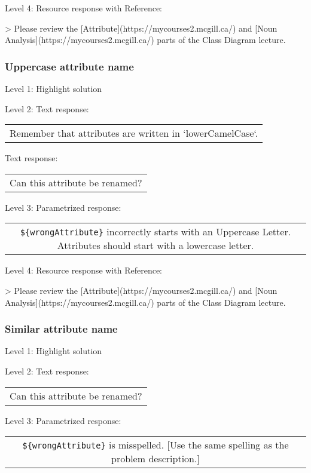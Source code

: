 \noindent Level 4: Resource response with Reference:

> Please review the [Attribute](https://mycourses2.mcgill.ca/) and [Noun Analysis](https://mycourses2.mcgill.ca/) parts of the Class Diagram lecture.


\subsubsection{Uppercase attribute name}

\noindent Level 1: Highlight solution \medskip

\noindent Level 2: Text response: \medskip

\begin{tabular}{|c}
Remember that attributes are written in `lowerCamelCase`.
\end{tabular} \medskip

Text response: \medskip

\begin{tabular}{|c}
Can this attribute be renamed?
\end{tabular} \medskip

\noindent Level 3: Parametrized response: \medskip

\begin{tabular}{|c}
\verb|${wrongAttribute}| incorrectly starts with an Uppercase Letter. Attributes should start with a lowercase letter.
\end{tabular} \medskip

\noindent Level 4: Resource response with Reference:

> Please review the [Attribute](https://mycourses2.mcgill.ca/) and [Noun Analysis](https://mycourses2.mcgill.ca/) parts of the Class Diagram lecture.


\subsubsection{Similar attribute name}

\noindent Level 1: Highlight solution \medskip

\noindent Level 2: Text response: \medskip

\begin{tabular}{|c}
Can this attribute be renamed?
\end{tabular} \medskip

\noindent Level 3: Parametrized response: \medskip

\begin{tabular}{|c}
\verb|${wrongAttribute}| is misspelled. [Use the same spelling as the problem description.]
\end{tabular} \medskip

